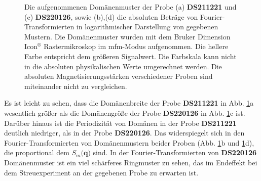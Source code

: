 \begin{figure}[H]
    \centering
    
    \caption{Die aufgenommenen Domänenmuster der Probe (a) \textbf{DS211221} und (c) \textbf{DS220126}, sowie (b),(d) die absoluten Beträge von Fourier-Transformierten in logarithmischer Darstellung von gegebenen Mustern. Die Domänenmuster wurden mit dem Bruker Dimension Icon$^{\text{®}}$ Rastermikroskop im \gls{mfm}-Modus aufgenommen. Die hellere Farbe entspricht dem größeren Signalwert. Die Farbskala kann nicht in die absoluten physikalischen Werte umgerechnet werden. Die absoluten Magnetisierungsstärken verschiedener Proben sind miteinander nicht zu vergleichen.}
    \label{fig:mfm-amplitude-ft}
\end{figure}
\noindent
Es ist leicht zu sehen, dass die Domänenbreite der Probe \textbf{DS211221} in Abb. \ref{fig:mfm-amplitude-ft}a wesentlich größer als die Domänengröße der Probe \textbf{DS220126} in Abb. \ref{fig:mfm-amplitude-ft}c ist. Darüber hinaus ist die Periodizität von Domänen in der Probe \textbf{DS211221} deutlich niedriger, als in der Probe  \textbf{DS220126}. Das widerspiegelt sich in den Fourier-Transformierten von Domänenmustern beider Proben (Abb. \ref{fig:mfm-amplitude-ft}b und \ref{fig:mfm-amplitude-ft}d), die proportional dem $S_m(\mathbf{q)}$ sind. In der Fourier-Transformierten von \textbf{DS220126} Domänenmuster ist ein viel schärferes Ringmuster zu sehen, das im Endeffekt bei dem Streuexperiment an der gegebenen Probe zu erwarten ist.

